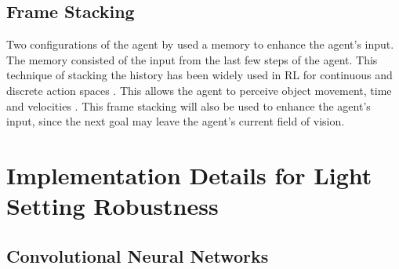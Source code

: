 \subsection{Frame Stacking}

Two configurations of the agent by \autocite{maximilian} used a memory to enhance the agent's input. The memory consisted of the input from the last few steps of the agent. This technique of stacking the history has been widely used in RL for continuous \autocite{atari} and discrete action spaces \autocite{alphago}. This allows the agent to perceive object movement, time and velocities \autocite{atari}.
This frame stacking will also be used to enhance the agent's input, since the next goal may leave the agent's current field of vision.





\section{Implementation Details for Light Setting Robustness} \label{light_setting_robustness}

\subsection{Convolutional Neural Networks}

